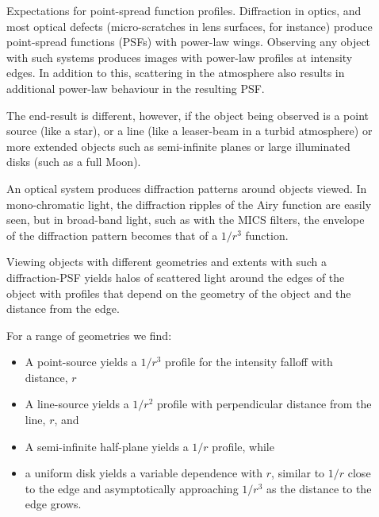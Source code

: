 \documentclass[final,hyperref={pdfpagelabels=false}]{beamer}
\begin{document}
\begin{frame}[t]
\begin{columns}[t]
\begin{column}{.23\textwidth}
\end{column} %
\begin{column}{.01\textwidth}\end{column} %

\begin{column}{.23\textwidth} %



\begin{block}{Expectations for point-spread function profiles.}
Diffraction in optics, and most optical defects (micro-scratches in lens surfaces, for instance) produce point-spread functions (PSFs) with power-law wings. Observing any object with such systems produces images with power-law profiles at intensity edges. In addition to this, scattering in the atmosphere also results in additional power-law behaviour in the resulting PSF. 

The end-result is different, however, if the object being observed is a point source (like a star), or a line (like a leaser-beam in a turbid atmosphere) or more extended objects such as semi-infinite planes or large illuminated disks (such as a full Moon).

An optical system produces diffraction patterns around objects viewed. In mono-chromatic light, the diffraction ripples of the Airy function are easily seen, but in broad-band light, such as with the MICS filters, the envelope of the diffraction pattern becomes that of a $1/r^3$ function.

Viewing objects with different geometries and extents with such a diffraction-PSF yields halos of scattered light around the edges of the object with profiles that depend on the geometry of the object and the distance from the edge.

For a range of geometries we find:
\begin{itemize}
    \item A point-source yields a $1/r^3$ profile for the intensity falloff with distance, $r$
    \item A line-source yields a $1/r^2$ profile with perpendicular distance from the line, $r$, and
    \item A semi-infinite half-plane yields a $1/r$ profile, while
    \item a uniform disk yields a variable dependence with $r$, similar to $1/r$ close to the edge and asymptotically approaching $1/r^3$ as the distance to the edge grows.
\end{itemize}


\end{block}
\end{column}
\end{columns}
\end{frame}
\end{document}
